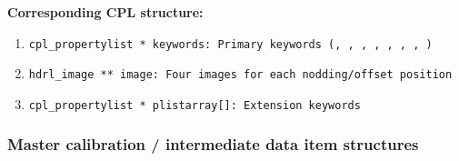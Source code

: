 \begin{datastructdef}
\textbf{Corresponding \ac{CPL} structure:}
\begin{enumerate}
    \item \texttt{cpl\_propertylist * keywords: Primary keywords (,  ,  ,  ,  ,  , , )}
    \item \texttt{hdrl\_image ** image: Four images for each nodding/offset position}
    \item \texttt{cpl\_propertylist * plistarray[]: Extension keywords}
\end{enumerate}
\end{datastructdef}





\subsubsection{Master calibration / intermediate data item structures}\label{sssec:lmsprocdatastructs}


